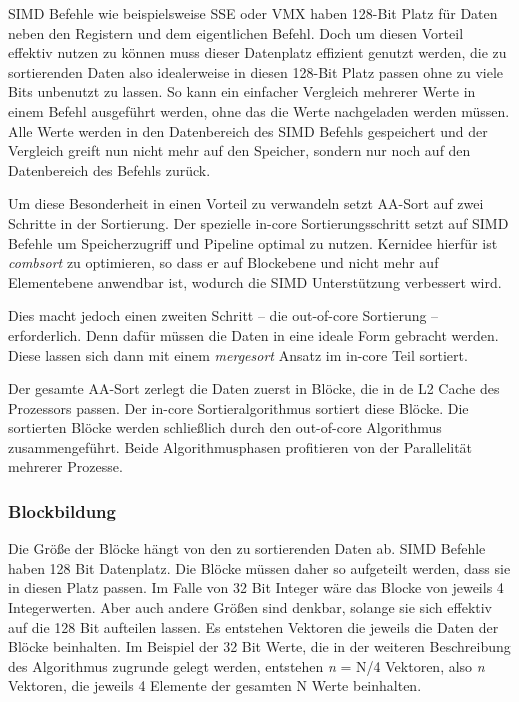 SIMD Befehle wie beispielsweise SSE oder VMX haben 128-Bit Platz für Daten neben den Registern und dem eigentlichen Befehl. Doch um diesen Vorteil effektiv nutzen zu können muss dieser Datenplatz effizient genutzt werden, die zu sortierenden Daten also idealerweise in diesen 128-Bit Platz passen ohne zu viele Bits unbenutzt zu lassen. So kann ein einfacher Vergleich mehrerer Werte in einem Befehl ausgeführt werden, ohne das die Werte nachgeladen werden müssen. Alle Werte werden in den Datenbereich des SIMD Befehls gespeichert und der Vergleich greift nun nicht mehr auf den Speicher, sondern nur noch auf den Datenbereich des Befehls zurück.

Um diese Besonderheit in einen Vorteil zu verwandeln setzt AA-Sort auf zwei Schritte in der Sortierung. Der spezielle in-core Sortierungsschritt setzt auf SIMD Befehle um Speicherzugriff und Pipeline optimal zu nutzen. Kernidee hierfür ist \textit{combsort} \cite{LACEY} zu optimieren, so dass er auf Blockebene und nicht mehr auf Elementebene anwendbar ist, wodurch die SIMD Unterstützung verbessert wird.

Dies macht jedoch einen zweiten Schritt – die out-of-core Sortierung – erforderlich. Denn dafür müssen die Daten in eine ideale Form gebracht werden. Diese lassen sich dann mit einem \textit{mergesort} Ansatz im in-core Teil sortiert.

Der gesamte AA-Sort zerlegt die Daten zuerst in Blöcke, die in de L2 Cache des Prozessors passen. Der in-core Sortieralgorithmus sortiert diese Blöcke. Die sortierten Blöcke werden schließlich durch den out-of-core Algorithmus zusammengeführt. Beide Algorithmusphasen profitieren von der Parallelität mehrerer Prozesse.


\subsubsection*{Blockbildung}
\label{sec:AA-Sort_Blockbildung}

Die Größe der Blöcke hängt von den zu sortierenden Daten ab. SIMD Befehle haben 128 Bit Datenplatz. Die Blöcke müssen daher so aufgeteilt werden, dass sie in diesen Platz passen. Im Falle von 32 Bit Integer wäre das Blocke von jeweils 4 Integerwerten. Aber auch andere Größen sind denkbar, solange sie sich effektiv auf die 128 Bit aufteilen lassen. Es entstehen Vektoren die jeweils die Daten der Blöcke beinhalten. Im Beispiel der 32 Bit Werte, die in der weiteren Beschreibung des Algorithmus zugrunde gelegt werden, entstehen \textit{n} = N/4 Vektoren, also \textit{n} Vektoren, die jeweils 4 Elemente der gesamten N Werte beinhalten.

